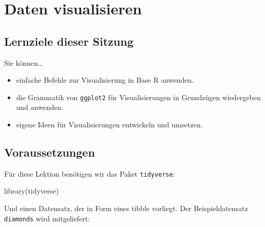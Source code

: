\documentclass[
  ngerman,
]{article}
\newenvironment{Shaded}{\begin{snugshade}}{\end{snugshade}}
\newcommand{\FunctionTok}[1]{\textcolor[rgb]{0.00,0.00,0.00}{#1}}
\newcommand{\NormalTok}[1]{#1}
\providecommand{\tightlist}{%
  \setlength{\itemsep}{0pt}\setlength{\parskip}{0pt}}
\begin{document}
\hypertarget{daten-visualisieren}{%
\section{Daten visualisieren}\label{daten-visualisieren}}

\hypertarget{lernziele-dieser-sitzung}{%
\subsection{Lernziele dieser Sitzung}\label{lernziele-dieser-sitzung}}

Sie können\ldots{}

\begin{itemize}
\tightlist
\item
  einfache Befehle zur Visualisierung in Base R anwenden.
\item
  die Grammatik von \texttt{ggplot2} für Visualisierungen in Grundzügen wiedergeben und anwenden.
\item
  eigene Ideen für Visualisierungen entwickeln und umsetzen.
\end{itemize}

\hypertarget{voraussetzungen}{%
\subsection{Voraussetzungen}\label{voraussetzungen}}

Für diese Lektion benötigen wir das Paket \texttt{tidyverse}:

\begin{Shaded}
\begin{Highlighting}[]
\FunctionTok{library}\NormalTok{(tidyverse)}
\end{Highlighting}
\end{Shaded}

Und einen Datensatz, der in Form eines tibble vorliegt. Der Beispieldatensatz \texttt{diamonds} wird mitgeliefert:
\end{document}
